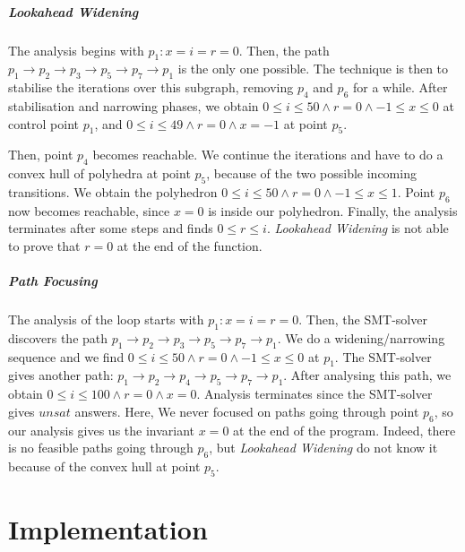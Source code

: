 \documentclass[a4paper,english,titlepage,11pt]{report}
\begin{document}
\paragraph{Lookahead Widening} 
The analysis begins with $p_1: x=i=r=0$. Then, the path $p_1 \rightarrow p_2
\rightarrow p_3 \rightarrow p_5 \rightarrow p_7 \rightarrow p_1$ is the only one
possible. The technique is then to stabilise the iterations over this subgraph,
removing $p_4$ and $p_6$ for a while. After stabilisation and narrowing phases,
we obtain $ 0 \leq i \leq 50 \wedge r=0 \wedge -1 \leq x \leq 0$ at
control point $p_1$, and 
$ 0 \leq i \leq 49 \wedge r=0 \wedge x=-1$ at point $p_5$.

Then, point $p_4$ becomes reachable. We continue the iterations and have to do
a convex hull of polyhedra at point $p_5$, because of the two possible incoming
transitions.
We obtain the polyhedron
$ 0 \leq i \leq 50 \wedge r=0 \wedge -1 \leq x \leq 1$.
Point $p_6$ now becomes reachable, since $x=0$ is inside our polyhedron.
Finally, the analysis terminates after some steps and finds $0 \leq r \leq i$.
\emph{Lookahead Widening} is not able to prove that $r = 0$ at the end of the
function.

\paragraph{Path Focusing} 
The analysis of the loop starts with 
$p_1: x=i=r=0$. Then, the SMT-solver discovers the path $p_1 \rightarrow p_2
\rightarrow p_3 \rightarrow p_5 \rightarrow p_7 \rightarrow p_1$. We do a
widening/narrowing sequence and we find 
$ 0 \leq i \leq 50 \wedge r=0 \wedge -1 \leq x \leq 0$ at $p_1$. The SMT-solver
gives another path: 
$p_1 \rightarrow p_2
\rightarrow p_4 \rightarrow p_5 \rightarrow p_7 \rightarrow p_1$. After
analysing this path, we obtain 
$ 0 \leq i \leq 100 \wedge r=0 \wedge x=0$. Analysis terminates since the
SMT-solver gives $unsat$ answers. Here, We never focused on paths going through
point $p_6$, so our analysis gives us the invariant $x=0$ at the end of the
program. Indeed, there is no feasible paths going through $p_6$, but
\emph{Lookahead Widening} do not know it because of the convex hull at point
$p_5$.





\FloatBarrier
\chapter{Implementation}\label{implementationpart}
\end{document}
